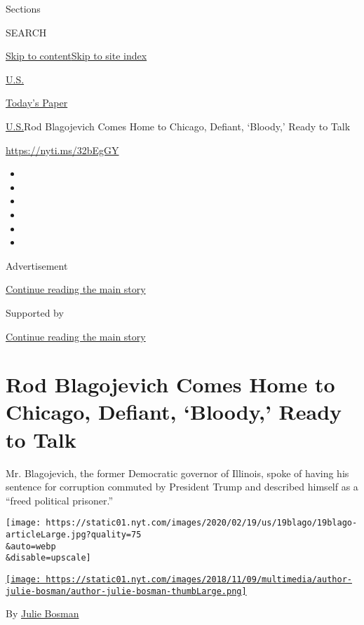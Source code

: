 Sections

SEARCH

\protect\hyperlink{site-content}{Skip to
content}\protect\hyperlink{site-index}{Skip to site index}

\href{https://www.nytimes.com/section/us}{U.S.}

\href{https://myaccount.nytimes.com/auth/login?response_type=cookie\&client_id=vi}{}

\href{https://www.nytimes.com/section/todayspaper}{Today's Paper}

\href{/section/us}{U.S.}\textbar{}Rod Blagojevich Comes Home to Chicago,
Defiant, `Bloody,' Ready to Talk

\url{https://nyti.ms/32bEgGY}

\begin{itemize}
\item
\item
\item
\item
\item
\item
\end{itemize}

Advertisement

\protect\hyperlink{after-top}{Continue reading the main story}

Supported by

\protect\hyperlink{after-sponsor}{Continue reading the main story}

\hypertarget{rod-blagojevich-comes-home-to-chicago-defiant-bloody-ready-to-talk}{%
\section{Rod Blagojevich Comes Home to Chicago, Defiant, `Bloody,' Ready
to
Talk}\label{rod-blagojevich-comes-home-to-chicago-defiant-bloody-ready-to-talk}}

Mr. Blagojevich, the former Democratic governor of Illinois, spoke of
having his sentence for corruption commuted by President Trump and
described himself as a ``freed political prisoner.''

\texttt{[image: https://static01.nyt.com/images/2020/02/19/us/19blago/19blago-articleLarge.jpg?quality=75\\\&auto=webp\\\&disable=upscale]}

\href{https://www.nytimes.com/by/julie-bosman}{\texttt{[image: https://static01.nyt.com/images/2018/11/09/multimedia/author-julie-bosman/author-julie-bosman-thumbLarge.png]}}

By \href{https://www.nytimes.com/by/julie-bosman}{Julie Bosman}


